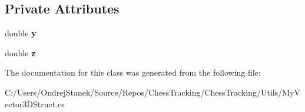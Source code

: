 \subsection*{Private Attributes}
\begin{DoxyCompactItemize}
\item 
\mbox{\label{class_chess_tracking_1_1_utils_1_1_my_vector3_d_struct_ad17b735c1701d54838724fadd53ecec3}} 
double {\bfseries y}
\item 
\mbox{\label{class_chess_tracking_1_1_utils_1_1_my_vector3_d_struct_a64c78c260e8f08e3fb26083cc5ac81d1}} 
double {\bfseries z}
\end{DoxyCompactItemize}


The documentation for this class was generated from the following file\+:\begin{DoxyCompactItemize}
\item 
C\+:/\+Users/\+Ondrej\+Stanek/\+Source/\+Repos/\+Chess\+Tracking/\+Chess\+Tracking/\+Utils/My\+Vector3\+D\+Struct.\+cs\end{DoxyCompactItemize}
